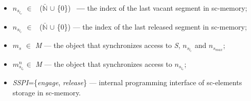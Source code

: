 \documentclass[10pt, a4paper, twocolumn]{article}
\begin{document}
\begin{itemize}[noitemsep,topsep=0pt,parsep=0pt,partopsep=0pt]
    \item  $n_{s_{l_{v}}}$ $\in $ \ ($\mathbb{\bar N}$ $\cup$ \{0\}) \ \textbf{--- } the index of the last vacant segment in sc-memory;
    \item $n_{s_{l_{r}}}$ $\in $  \ ($\mathbb{\bar N}$ $\cup$ \{0\}) --- the index of the last released segment in sc-memory;
    \item $m_{s}$ $\in $  \textit{M} --- the object that synchronizes access to \textit{S},  $n_{s_{l_{e}}}$ and $n_{s_{max}}$;
    \item $m^n_{s_{l_{r}}}$$\in $ \textit{M} --- the object that synchronizes access to $n_{s_{l_{r}}}$;
    \item \textit{SSPI}=\{\textit{engage}, \textit{release}\} --- internal programming interface of sc-elements storage in sc-memory.
\end{itemize}
\end{document}
